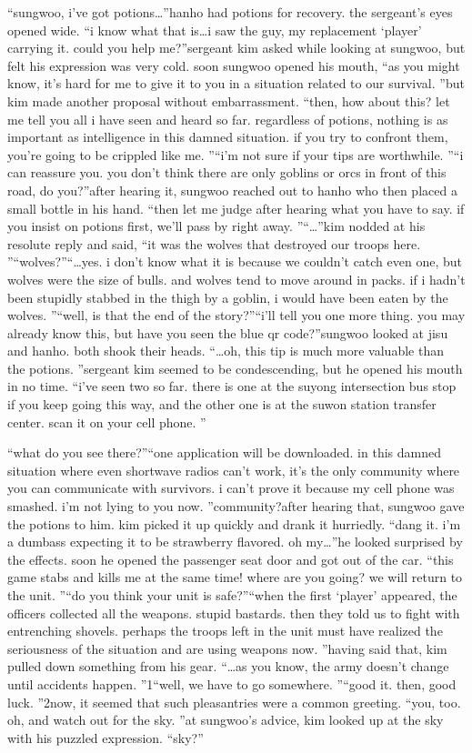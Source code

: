 “sungwoo, i’ve got potions…”hanho had potions for recovery.
 the sergeant’s eyes opened wide.
“i know what that is…i saw the guy, my replacement ‘player’ carrying it.
 could you help me?”sergeant kim asked while looking at sungwoo, but felt his expression was very cold.
soon sungwoo opened his mouth, “as you might know, it’s hard for me to give it to you in a situation related to our survival.
”but kim made another proposal without embarrassment.
“then, how about this? let me tell you all i have seen and heard so far.
 regardless of potions, nothing is as important as intelligence in this damned situation.
 if you try to confront them, you’re going to be crippled like me.
”“i’m not sure if your tips are worthwhile.
”“i can reassure you.
 you don’t think there are only goblins or orcs in front of this road, do you?”after hearing it, sungwoo reached out to hanho who then placed a small bottle in his hand.
“then let me judge after hearing what you have to say.
 if you insist on potions first, we’ll pass by right away.
”“…”kim nodded at his resolute reply and said, “it was the wolves that destroyed our troops here.
”“wolves?”“…yes.
 i don’t know what it is because we couldn’t catch even one, but wolves were the size of bulls.
 and wolves tend to move around in packs.
 if i hadn’t been stupidly stabbed in the thigh by a goblin, i would have been eaten by the wolves.
”“well, is that the end of the story?”“i’ll tell you one more thing.
 you may already know this, but have you seen the blue qr code?”sungwoo looked at jisu and hanho.
 both shook their heads.
“…oh, this tip is much more valuable than the potions.
”sergeant kim seemed to be condescending, but he opened his mouth in no time.
“i’ve seen two so far.
 there is one at the suyong intersection bus stop if you keep going this way, and the other one is at the suwon station transfer center.
 scan it on your cell phone.
”

“what do you see there?”“one application will be downloaded.
 in this damned situation where even shortwave radios can’t work, it’s the only community where you can communicate with survivors.
 i can’t prove it because my cell phone was smashed.
 i’m not lying to you now.
”community?after hearing that, sungwoo gave the potions to him.
 kim picked it up quickly and drank it hurriedly.
“dang it.
 i’m a dumbass expecting it to be strawberry flavored.
 oh my…”he looked surprised by the effects.
 soon he opened the passenger seat door and got out of the car.
“this game stabs and kills me at the same time! where are you going? we will return to the unit.
”“do you think your unit is safe?”“when the first ‘player’ appeared, the officers collected all the weapons.
 stupid bastards.
 then they told us to fight with entrenching shovels.
 perhaps the troops left in the unit must have realized the seriousness of the situation and are using weapons now.
”having said that, kim pulled down something from his gear.
“…as you know, the army doesn’t change until accidents happen.
”1“well, we have to go somewhere.
”“good it.
 then, good luck.
”2now, it seemed that such pleasantries were a common greeting.
“you, too.
 oh, and watch out for the sky.
”at sungwoo’s advice, kim looked up at the sky with his puzzled expression.
“sky?”

 